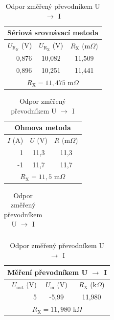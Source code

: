 \documentclass[a4paper,12pt]{article}   %
\newcommand{\tsub}[1]{$_\textrm{#1}$}
\newcommand{\tohm}{$\Omega$}
\newcommand{\var}[2]{$#1_\text{#2}$}
\newcommand{\sub}[1]{_{\text{#1}}}
\newcommand{\rx}{R\sub{X}}
\begin{document}
\begin{table}[h!]
  \centering
  \begin{subtable}[t]{.4\textwidth}
    \centering
    \begin{tabular}{|r|c|c|}
      \hline
      \multicolumn{3}{|c|}{Sériová srovnávací metoda}\\\hline\hline
      $U\sub{R\tsub{N}}$ (V)	&	$U\sub{R\tsub{X}}$ (V)	&	$R_\text{X}$ (m\tohm)	\\\hline
      0,876   &	10,082	  &	11,509	    \\\hline
      0,896   &	10,251	  &	11,441	    \\\hline\hline
      \multicolumn{3}{|c|}{$\rx=11,475$ m\tohm}\\\hline
    \end{tabular}
    \caption{Odpor vypočtený srovnávací metodou}
    \label{tab:srov}
  \end{subtable}
  \begin{subtable}[t]{.4\textwidth}
    \centering
    \begin{tabular}{|r|c|c|}
      \hline
      \multicolumn{3}{|c|}{Ohmova metoda}\\\hline\hline
      $I$ (A)	&	$U$ (V)	&	$R$ (m\tohm)	\\\hline
      1	      &	11,3	  &	11,3	    \\\hline
      -1	    &	11,7	  &	11,7	    \\\hline\hline
      \multicolumn{3}{|c|}{$\rx=11,5$ m\tohm}\\\hline
    \end{tabular}
  \caption{Odpor vypočtený Ohmovou metodou}
  \label{tab:ohm}
  \end{subtable}
  \begin{subtable}[]{\textwidth}
    \begin{tabular}{c}
      \\
    \end{tabular}
  \end{subtable}
  \begin{subtable}[]{.4\textwidth}
    \centering
    \begin{tabular}{|r|c|c|}
      \hline
      \multicolumn{3}{|c|}{Měření převodníkem U \var{\rightarrow}{} I}\\\hline\hline
      $U\sub{out}$ (V)	&	$U\sub{in}$ (V)	&	$R_\text{X}$ (k\tohm)	\\\hline
      5   &	-5,99	  &	11,980	    \\\hline\hline
      \multicolumn{3}{|c|}{$\rx=11,980$ k\tohm}\\\hline
    \end{tabular}
    \caption{Odpor změřený převodníkem U \var{\rightarrow}{} I}
    \label{tab:prevod}
  \end{subtable}
\end{table}
\end{document}
